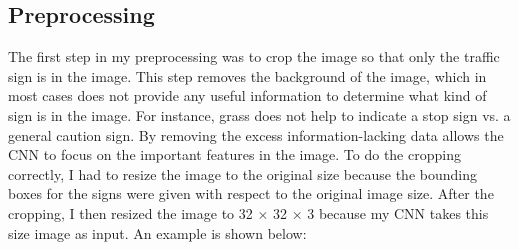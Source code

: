 \documentclass[12pt]{article}
\begin{document}
\subsection{Preprocessing}
The first step in my preprocessing was to crop the image so that only the traffic sign is in the image. This step removes the background of the image, which in most cases does not provide any useful information to determine what kind of sign is in the image. For instance, grass does not help to indicate a stop sign vs. a general caution sign. By removing the excess information-lacking data allows the CNN to focus on the important features in the image. To do the cropping correctly, I had to resize the image to the original size because the bounding boxes for the signs were given with respect to the original image size. After the cropping, I then resized the image to 32 $\times$ 32 $\times$ 3 because my CNN takes this size image as input. An example is shown below:
\end{document}
